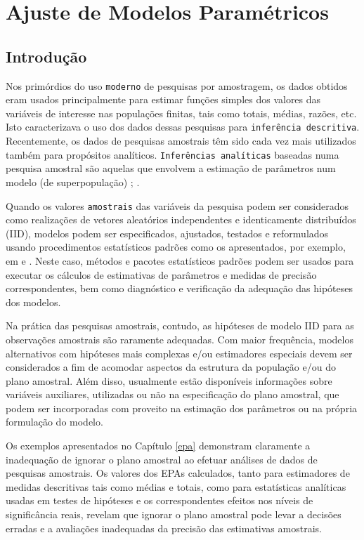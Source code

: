 \documentclass[]{book}
\theoremstyle{definition}
\theoremstyle{definition}
\theoremstyle{definition}
\theoremstyle{remark}
\begin{document}
\chapter{Ajuste de Modelos Paramétricos}\label{ajmodpar}

\section{Introdução}\label{modpar1}

Nos primórdios do uso \texttt{moderno} de pesquisas por amostragem, os
dados obtidos eram usados principalmente para estimar funções simples
dos valores das variáveis de interesse nas populações finitas, tais como
totais, médias, razões, etc. Isto caracterizava o uso dos dados dessas
pesquisas para \texttt{inferência\ descritiva}. Recentemente, os dados
de pesquisas amostrais têm sido cada vez mais utilizados também para
propósitos analíticos. \texttt{Inferências\ analíticas} baseadas numa
pesquisa amostral são aquelas que envolvem a estimação de parâmetros num
modelo (de superpopulação) \citep{kalton83b}; \citep{binder87}.

Quando os valores \texttt{amostrais} das variáveis da pesquisa podem ser
considerados como realizações de vetores aleatórios independentes e
identicamente distribuídos (IID), modelos podem ser especificados,
ajustados, testados e reformulados usando procedimentos estatísticos
padrões como os apresentados, por exemplo, em \citep{bickel} e
\citep{garthwaite}. Neste caso, métodos e pacotes estatísticos padrões
podem ser usados para executar os cálculos de estimativas de parâmetros
e medidas de precisão correspondentes, bem como diagnóstico e
verificação da adequação das hipóteses dos modelos.

Na prática das pesquisas amostrais, contudo, as hipóteses de modelo IID
para as observações amostrais são raramente adequadas. Com maior
frequência, modelos alternativos com hipóteses mais complexas e/ou
estimadores especiais devem ser considerados a fim de acomodar aspectos
da estrutura da população e/ou do plano amostral. Além disso, usualmente
estão disponíveis informações sobre variáveis auxiliares, utilizadas ou
não na especificação do plano amostral, que podem ser incorporadas com
proveito na estimação dos parâmetros ou na própria formulação do modelo.

Os exemplos apresentados no Capítulo \ref{epa} demonstram claramente a
inadequação de ignorar o plano amostral ao efetuar análises de dados de
pesquisas amostrais. Os valores dos EPAs calculados, tanto para
estimadores de medidas descritivas tais como médias e totais, como para
estatísticas analíticas usadas em testes de hipóteses e os
correspondentes efeitos nos níveis de significância reais, revelam que
ignorar o plano amostral pode levar a decisões erradas e a avaliações
inadequadas da precisão das estimativas amostrais.
\end{document}
